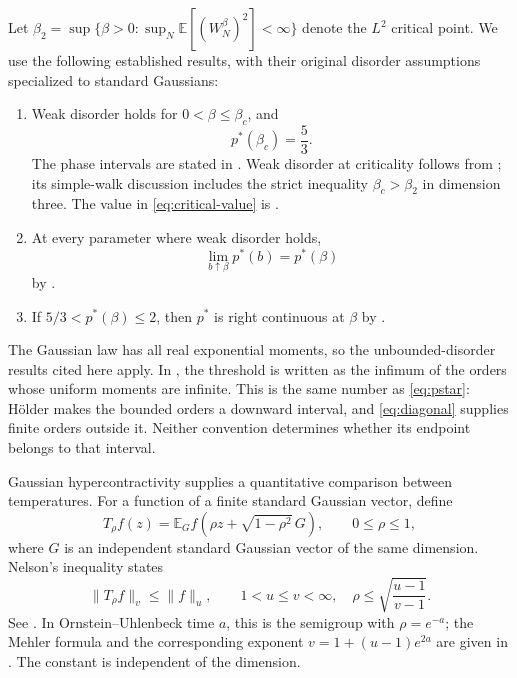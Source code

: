 \documentclass[11pt]{amsart}
\newcommand{\E}{\mathbb E}
\newcommand{\ps}{p^*}
\theoremstyle{remark}
\numberwithin{equation}{section}
\begin{document}
Let $\beta_2=\sup\{\beta>0:\sup_N\E[(W_N^\beta)^2]<\infty\}$ denote
the $L^2$ critical point. We use the following established results, with their
original disorder assumptions specialized to standard Gaussians:
\begin{enumerate}
\item Weak disorder holds for $0<\beta\le\beta_c$, and
\begin{equation}\label{eq:critical-value}
 \ps(\beta_c)=\frac53.
\end{equation}
The phase intervals are stated in \cite[Theorem~A]{Junk}. Weak disorder at
criticality follows from \cite[Theorem~2.1 and the discussion after
Remark~2.2]{Critical}; its simple-walk discussion includes the strict inequality
$\beta_c>\beta_2$ in dimension three. The value in
\eqref{eq:critical-value} is \cite[Corollary~2.5]{Critical}.
\item At every parameter where weak disorder holds,
\begin{equation}\label{eq:left-continuity}
 \lim_{b\uparrow\beta}\ps(b)=\ps(\beta)
\end{equation}
by \cite[Corollary~2.11(i)]{Tail}.
\item If $5/3<\ps(\beta)\le2$, then $\ps$ is right continuous at $\beta$
by \cite[Theorem~1.2(i)]{Junk}.
\end{enumerate}
The Gaussian law has all real exponential moments, so the unbounded-disorder
results cited here apply. In \cite{Tail}, the threshold is written as the
infimum of the orders whose uniform moments are infinite. This is the same
number as \eqref{eq:pstar}: H\"older makes the bounded orders a downward interval,
and \eqref{eq:diagonal} supplies finite orders outside it. Neither convention
determines whether its endpoint belongs to that interval.

Gaussian hypercontractivity supplies a quantitative comparison between
temperatures. For a function of a finite standard Gaussian vector, define
\[
 T_\rho f(z)=\E_G f(\rho z+\sqrt{1-\rho^2}\,G),\qquad 0\le\rho\le1,
\]
where $G$ is an independent standard Gaussian vector of the same dimension.
Nelson's inequality states
\begin{equation}\label{eq:hypercontractivity}
 \|T_\rho f\|_v\le\|f\|_u,
 \qquad 1<u\le v<\infty,\quad
 \rho\le\sqrt{\frac{u-1}{v-1}}.
\end{equation}
See \cite[Theorem~1.1 in the author-generated copy]{Kemp}. In Ornstein--Uhlenbeck time $a$, this is the
semigroup with $\rho=e^{-a}$; the Mehler formula and the corresponding exponent
$v=1+(u-1)e^{2a}$ are given in \cite[Lemma~1.8 and Theorem~2.1]{ChafaiLehec}.
The constant is independent of the dimension.
\end{document}
